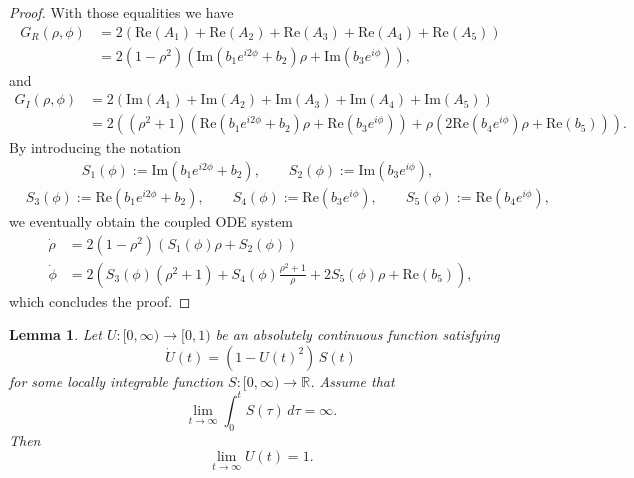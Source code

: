 \documentclass[10pt]{article}
\newtheorem{lemma}[theorem]{Lemma}
\theoremstyle{definition}
\theoremstyle{definition}
\numberwithin{equation}{section}
\newcommand{\im}[1]{\mathrm{Im} \left(#1\right)}
\newcommand{\re}[1]{\mathrm{Re}\left(#1\right)}
\newcommand{\Drho}{\Dot{\rho}}
\newcommand{\Dphi}{\Dot{\phi}}
\begin{document}
\begin{proof}
    With those equalities we have 
    \begin{equation*}
    \begin{aligned}
    G_R(\rho, \phi) &= 2 \left( \re{A_1} + \re{A_2} + \re{A_3} + \re{A_4} + \re{A_5} \right)\\
    &= 2 (1-\rho^2)\left( \im{b_1 e^{i2\phi} + b_2} \rho  + \im{b_3 e^{i\phi}} \right),
    \end{aligned}
    \end{equation*}
    and
    \begin{equation*}
    \begin{aligned}
    G_I(\rho, \phi) &= 2 \left( \im{A_1} + \im{A_2} + \im{A_3} + \im{A_4} + \im{A_5} \right)\\
    &= 2 \left( (\rho^2 + 1) \left(  \re{b_1 e^{i2\phi} + b_2} \rho + \re{b_3 e^{i\phi}} \right) + \rho \left(2 \re{b_4 e^{i\phi}} \rho + \re{b_5} \right) \right) .
    \end{aligned}
    \end{equation*}
    By introducing the notation
    \begin{equation}
    \label{eq:func_Sj}
    \begin{aligned}
    &\qquad \qquad S_1(\phi) := \im{b_1 e^{i2\phi} + b_2}, \qquad S_2(\phi) := \im{b_3 e^{i\phi}},\\[5pt]
    &S_3(\phi) := \re{b_1 e^{i2\phi} + b_2}, \qquad S_4(\phi) := \re{b_3 e^{i\phi}}, \qquad S_5(\phi) := \re{b_4 e^{i\phi}},
    \end{aligned}
    \end{equation}
    we eventually obtain the coupled ODE system
    \begin{equation*}
    \begin{split}
        \Drho &= 2 (1-\rho^2) \left( S_1(\phi) \rho + S_2(\phi) \right)\\
        \Dphi &= 2 \left( S_3(\phi) (\rho^2+1) +  S_4(\phi) \frac{\rho^2 + 1}{\rho} + 2 S_5(\phi) \rho + \re{b_5} \right),
    \end{split}
    \end{equation*}
    which concludes the proof.
\end{proof}

\begin{lemma}\label{lem:gamma-integral}
Let $U:[0,\infty)\to[0,1)$ be an absolutely continuous function satisfying
\begin{equation}\label{eq:gamma-ode}
\dot U(t)=(1-U(t)^2)\,S(t)
\end{equation}
for some locally integrable function $S:[0,\infty)\to\mathbb R$.
Assume that
\begin{equation}\label{eq:S-integral}
\lim_{t\to\infty}\int_0^t S(\tau)\,d\tau=\infty .
\end{equation}
Then
\[
\lim_{t\to\infty}U(t)=1 .
\]
\end{lemma}
\end{document}
